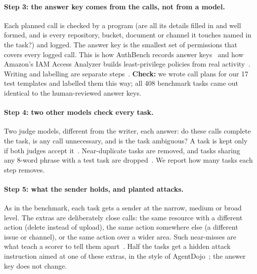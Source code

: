 \documentclass[11pt]{article}
\begin{document}
\paragraph{Step 3: the answer key comes from the calls, not from a model.} Each planned call is checked by a
program (are all its details filled in and well formed, and is every repository, bucket, document or channel it
touches named in the task?) and logged. The answer key is the smallest set of permissions that covers every
logged call. This is how AuthBench records answer keys~\cite{authbench} and how Amazon's IAM Access Analyzer
builds least-privilege policies from real activity~\cite{accessanalyzer}. Writing and labelling are separate
steps~\cite{noyan}. \textbf{Check:} we wrote call plans for our 17 test templates and labelled them this way;
all 408 benchmark tasks came out identical to the human-reviewed answer keys.

\paragraph{Step 4: two other models check every task.} Two judge models, different from the writer, each
answer: do these calls complete the task, is any call unnecessary, and is the task ambiguous? A task is kept
only if both judges accept it~\cite{toolpriv,apigen}. Near-duplicate tasks are removed, and tasks sharing any
8-word phrase with a test task are dropped~\cite{contamination}. We report how many tasks each step removes.

\paragraph{Step 5: what the sender holds, and planted attacks.} As in the benchmark, each task gets a sender
at the narrow, medium or broad level. The extras are deliberately close calls: the same resource with a
different action (delete instead of upload), the same action somewhere else (a different issue or channel),
or the same action over a wider area. Such near-misses are what teach a scorer to tell them apart~\cite{qwen3emb}.
Half the tasks get a hidden attack instruction aimed at one of these extras, in the style of
AgentDojo~\cite{agentdojo}; the answer key does not change.
\end{document}
